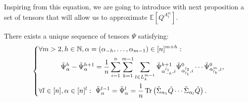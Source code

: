 \documentclass[a4papaer, titlepage]{book}
\begin{document}
  Inspiring from this equation, we are going to introduce with next proposition a set of tensors that will allow us to approximate $\mathbb E[Q^{A_1^m}]$.
  \begin{proposition}\label{pro:Definition_Phi}
    There exists a unique sequence of tensors $\Psi$ satisfying:
  \begin{align*}
  \left\{
    \begin{aligned}
    &\forall m >2, h \in \mathbb N, \alpha =(\alpha_{-h},\ldots, \alpha_{m-1}) \in [n]^{m+h}:\\
    &\hspace{1cm} \ \tilde \Psi_\alpha^h - \tilde \Psi_\alpha^{h+1} = \frac{1}{n} \sum_{i=1}^n\sum_{k=1}^{m-1}\sum_{l\in L_k^{m-1}} \tilde \Psi^{h+1}_{\alpha_{-h}^{l_1}, i} \tilde \Psi^0_{\alpha_{l_1}^{l_2}, i}\cdots \tilde \Psi^0_{\alpha_{l_k}^m, i},\\
    & \forall l \in[n], \alpha \in [n]^l: \ \tilde \Psi^{l-1}_{\alpha} = \tilde \Psi^l_{\alpha}  = \frac{1}{n} \operatorname{Tr} \left( \tilde \Sigma_{\alpha_1} \tilde Q  \cdots \tilde \Sigma_{\alpha_l} \tilde Q \right). 
    \end{aligned}\right.
  \end{align*}
  
  \end{proposition}
\end{document}
